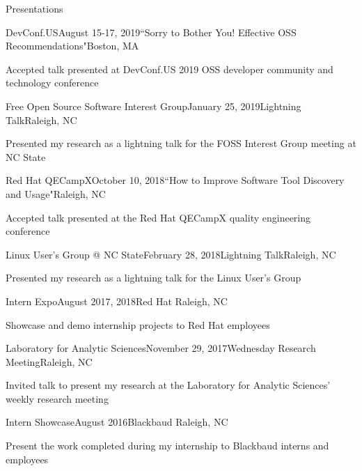 \documentclass{resume} %
\begin{document}
\begin{rSection}{Presentations}

\begin{rSubsection}{DevConf.US}{August 15-17, 2019}{``Sorry to Bother You! Effective OSS Recommendations"}{Boston, MA}
\item Accepted talk presented at DevConf.US 2019 OSS developer community and technology conference
\end{rSubsection}


\begin{rSubsection}{Free Open Source Software Interest Group}{January 25, 2019}{Lightning Talk}{Raleigh, NC}
\item Presented my research as a lightning talk for the FOSS Interest Group meeting at NC State
\end{rSubsection}


\begin{rSubsection}{Red Hat QECampX}{October 10, 2018}{``How to Improve Software Tool Discovery and Usage"}{Raleigh, NC}
\item Accepted talk presented at the Red Hat QECampX quality engineering conference
\end{rSubsection}

\begin{rSubsection}{Linux User's Group @ NC State}{February 28, 2018}{Lightning Talk}{Raleigh, NC}
\item Presented my research as a lightning talk for the Linux User's Group
\end{rSubsection}

\begin{rSubsection}{Intern Expo}{August 2017, 2018}{Red Hat }{Raleigh, NC}
\item Showcase and demo internship projects to Red Hat employees
\end{rSubsection}

\begin{rSubsection}{Laboratory for Analytic Sciences}{November 29, 2017}{Wednesday Research Meeting}{Raleigh, NC}
\item Invited talk to present my research at the Laboratory for Analytic Sciences' weekly research meeting
\end{rSubsection}

\begin{rSubsection}{Intern Showcase}{August 2016}{Blackbaud }{Raleigh, NC}
\item Present the work completed during my internship to Blackbaud interns and employees
\end{rSubsection}


\end{rSection}
\end{document}
